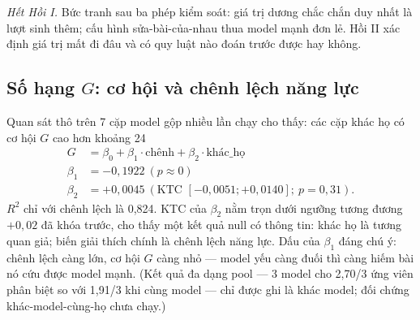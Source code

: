 \documentclass[12pt,a4paper]{article}
\begin{document}
\textit{Hết Hồi I.} Bức tranh sau ba phép kiểm soát: giá trị dương chắc chắn duy nhất là lượt sinh thêm; cấu hình sửa-bài-của-nhau thua model mạnh đơn lẻ. Hồi II xác định giá trị mất đi đâu và có quy luật nào đoán trước được hay không.

\subsection{Số hạng \(G\): cơ hội và chênh lệch năng lực}\label{sec:termG}

Quan sát thô trên 7 cặp model gộp nhiều lần chạy cho thấy: các cặp khác họ có cơ hội \(G\) cao hơn khoảng 24%
\begin{align*}
G &= \beta_0 + \beta_1\cdot\text{chênh} + \beta_2\cdot\text{khác\_họ}\\
\beta_1 &= -0{,}1922\ (p \approx 0)\\
\beta_2 &= +0{,}0045\ (\text{KTC } [-0{,}0051;+0{,}0140];\ p = 0{,}31).
\end{align*}
\(R^2\) chỉ với chênh lệch là 0,824. KTC của \(\beta_2\) nằm trọn dưới ngưỡng tương đương \(+0{,}02\) đã khóa trước, cho thấy một kết quả null có thông tin: khác họ là tương quan giả; biến giải thích chính là chênh lệch năng lực. Dấu của \(\beta_1\) đáng chú ý: chênh lệch càng lớn, cơ hội \(G\) càng nhỏ --- model yếu càng đuối thì càng hiếm bài nó cứu được model mạnh. (Kết quả đa dạng pool --- 3 model cho 2,70/3 ứng viên phân biệt so với 1,91/3 khi cùng model --- chỉ được ghi là khác model; đối chứng khác-model-cùng-họ chưa chạy.)
\end{document}
